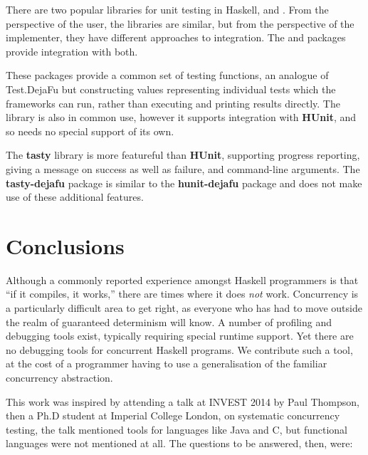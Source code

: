 There are two popular libraries for unit testing in Haskell,
 and .  From the perspective of the
user, the libraries are similar, but from the perspective of the
implementer, they have different approaches to integration.  The
 and  packages provide
integration with both.

These packages provide a common set of testing functions, an analogue
of Test.DejaFu but constructing values representing individual tests
which the frameworks can run, rather than executing and printing
results directly.  The  library is also in
common use, however it supports integration with \textbf{HUnit}, and
so needs no special support of its own.

The \textbf{tasty} library is more featureful than \textbf{HUnit},
supporting progress reporting, giving a message on success as well as
failure, and command-line arguments.  The \textbf{tasty-dejafu}
package is similar to the \textbf{hunit-dejafu} package and does not
make use of these additional features.

\section{Conclusions}
\label{sec:dejafu-conclusions}

Although a commonly reported experience amongst Haskell programmers is
that ``if it compiles, it works,'' there are times where it does
\emph{not} work.  Concurrency is a particularly difficult area to get
right, as everyone who has had to move outside the realm of guaranteed
determinism will know.  A number of profiling and debugging tools
exist, typically requiring special runtime support.  Yet there are no
debugging tools for concurrent Haskell programs.  We contribute such a
tool, at the cost of a programmer having to use a generalisation of
the familiar concurrency abstraction.

This work was inspired by attending a talk at INVEST 2014 by Paul
Thompson, then a Ph.D student at Imperial College London, on
systematic concurrency testing, the talk mentioned tools for languages
like Java and C, but functional languages were not mentioned at all.
The questions to be answered, then, were:

